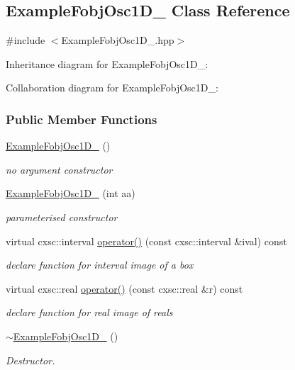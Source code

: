 \hypertarget{classExampleFobjOsc1D__2}{\subsection{\-Example\-Fobj\-Osc1\-D\-\_ \-Class \-Reference}
\label{classExampleFobjOsc1D__2}
}


{\ttfamily \#include $<$\-Example\-Fobj\-Osc1\-D\-\_.\-hpp$>$}



\-Inheritance diagram for \-Example\-Fobj\-Osc1\-D\-\_\-:


\-Collaboration diagram for \-Example\-Fobj\-Osc1\-D\-\_\-:
\subsubsection*{\-Public \-Member \-Functions}
\begin{DoxyCompactItemize}
\item 
\hyperlink{classExampleFobjOsc1D__2_ae1256faff1f2d7423a7ba5addabdf154}{\-Example\-Fobj\-Osc1\-D\-\_} ()
\begin{DoxyCompactList}\small\item\em no argument constructor \end{DoxyCompactList}\item 
\hyperlink{classExampleFobjOsc1D__2_a48d0038c33eb1d414426a980bd746437}{\-Example\-Fobj\-Osc1\-D\-\_} (int aa)
\begin{DoxyCompactList}\small\item\em parameterised constructor \end{DoxyCompactList}\item 
virtual cxsc\-::interval \hyperlink{classExampleFobjOsc1D__2_abd3c87b5de8855aecba04bc67a6f2e29}{operator()} (const cxsc\-::interval \&ival) const 
\begin{DoxyCompactList}\small\item\em declare function for interval image of a box \end{DoxyCompactList}\item 
virtual cxsc\-::real \hyperlink{classExampleFobjOsc1D__2_a6d666d591ec6db2de33fdd490f0837fb}{operator()} (const cxsc\-::real \&r) const 
\begin{DoxyCompactList}\small\item\em declare function for real image of reals \end{DoxyCompactList}\item 
\hyperlink{classExampleFobjOsc1D__2_a19399435a55caf4269d0125bb645add2}{$\sim$\-Example\-Fobj\-Osc1\-D\-\_} ()
\begin{DoxyCompactList}\small\item\em \-Destructor. \end{DoxyCompactList}\end{DoxyCompactItemize}
